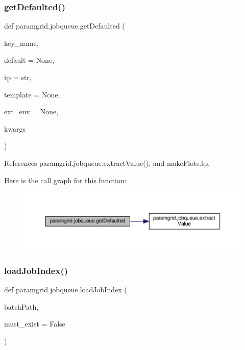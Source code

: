 \subsubsection{\texorpdfstring{get\+Defaulted()}{getDefaulted()}}
{\footnotesize\ttfamily def paramgrid.\+jobqueue.\+get\+Defaulted (\begin{DoxyParamCaption}\item[{}]{key\+\_\+name,  }\item[{}]{default = {\ttfamily None},  }\item[{}]{tp = {\ttfamily str},  }\item[{}]{template = {\ttfamily None},  }\item[{}]{ext\+\_\+env = {\ttfamily None},  }\item[{}]{kwargs }\end{DoxyParamCaption})}



References paramgrid.\+jobqueue.\+extract\+Value(), and make\+Plots.\+tp.

Here is the call graph for this function\+:
\nopagebreak
\begin{figure}[H]
\begin{center}
\leavevmode
\includegraphics[width=350pt]{namespaceparamgrid_1_1jobqueue_a46526092620bf46ab99b066c5c44d038_cgraph}
\end{center}
\end{figure}
\mbox{\label{namespaceparamgrid_1_1jobqueue_a29a41a32b0de4a0554ceeb588e81584c}} 
\subsubsection{\texorpdfstring{load\+Job\+Index()}{loadJobIndex()}}
{\footnotesize\ttfamily def paramgrid.\+jobqueue.\+load\+Job\+Index (\begin{DoxyParamCaption}\item[{}]{batch\+Path,  }\item[{}]{must\+\_\+exist = {\ttfamily False} }\end{DoxyParamCaption})}



